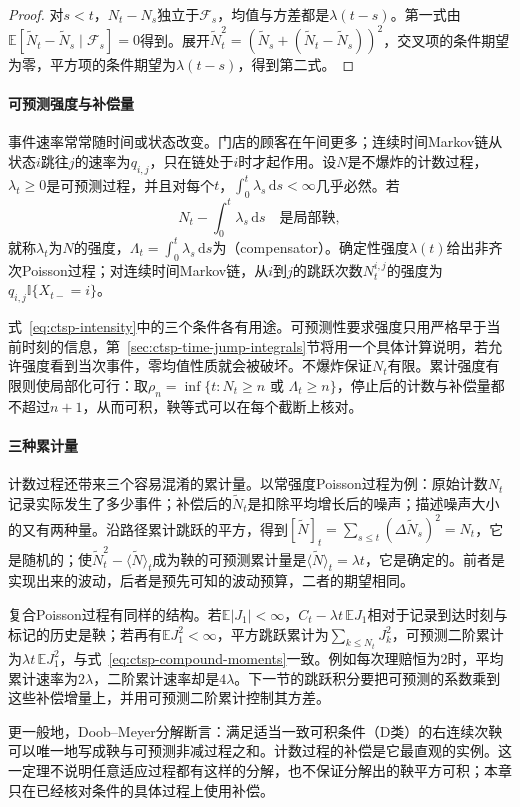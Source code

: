 \begin{proof}
对$s<t$，$N_t-N_s$独立于$\mathcal F_s$，均值与方差都是$\lambda(t-s)$。第一式由$\mathbb E[\widetilde N_t-\widetilde N_s\mid\mathcal F_s]=0$得到。展开$\widetilde N_t^2=(\widetilde N_s+(\widetilde N_t-\widetilde N_s))^2$，交叉项的条件期望为零，平方项的条件期望为$\lambda(t-s)$，得到第二式。
\end{proof}

\paragraph{可预测强度与补偿量}
事件速率常常随时间或状态改变。门店的顾客在午间更多；连续时间Markov链从状态$i$跳往$j$的速率为$q_{i,j}$，只在链处于$i$时才起作用。设$N$是不爆炸的计数过程，$\lambda_t\geq0$是可预测过程，并且对每个$t$，$\int_0^t\lambda_s\,\mathrm ds<\infty$几乎必然。若
\begin{equation}
  N_t-\int_0^t\lambda_s\,\mathrm ds\quad\text{是局部鞅},
  \label{eq:ctsp-intensity}
\end{equation}
就称$\lambda_t$为$N$的强度，$\Lambda_t=\int_0^t\lambda_s\,\mathrm ds$为（compensator）。确定性强度$\lambda(t)$给出非齐次Poisson过程；对连续时间Markov链，从$i$到$j$的跳跃次数$N^{i,j}_t$的强度为$q_{i,j}\mathbb I\{X_{t-}=i\}$。

式~\eqref{eq:ctsp-intensity}中的三个条件各有用途。可预测性要求强度只用严格早于当前时刻的信息，第~\ref{sec:ctsp-time-jump-integrals}节将用一个具体计算说明，若允许强度看到当次事件，零均值性质就会被破坏。不爆炸保证$N_t$有限。累计强度有限则使局部化可行：取$\rho_n=\inf\{t:N_t\geq n\text{ 或 }\Lambda_t\geq n\}$，停止后的计数与补偿量都不超过$n+1$，从而可积，鞅等式可以在每个截断上核对。

\paragraph{三种累计量}
计数过程还带来三个容易混淆的累计量。以常强度Poisson过程为例：原始计数$N_t$记录实际发生了多少事件；补偿后的$\widetilde N_t$是扣除平均增长后的噪声；描述噪声大小的又有两种量。沿路径累计跳跃的平方，得到$[\widetilde N]_t=\sum_{s\leq t}(\Delta\widetilde N_s)^2=N_t$，它是随机的；使$\widetilde N_t^2-\langle\widetilde N\rangle_t$成为鞅的可预测累计量是$\langle\widetilde N\rangle_t=\lambda t$，它是确定的。前者是实现出来的波动，后者是预先可知的波动预算，二者的期望相同。

复合Poisson过程有同样的结构。若$\mathbb E|J_1|<\infty$，$C_t-\lambda t\,\mathbb EJ_1$相对于记录到达时刻与标记的历史是鞅；若再有$\mathbb EJ_1^2<\infty$，平方跳跃累计为$\sum_{k\leq N_t}J_k^2$，可预测二阶累计为$\lambda t\,\mathbb EJ_1^2$，与式~\eqref{eq:ctsp-compound-moments}一致。例如每次理赔恒为$2$时，平均累计速率为$2\lambda$，二阶累计速率却是$4\lambda$。下一节的跳跃积分要把可预测的系数乘到这些补偿增量上，并用可预测二阶累计控制其方差。

更一般地，Doob--Meyer分解断言：满足适当一致可积条件（D类）的右连续次鞅可以唯一地写成鞅与可预测非减过程之和。计数过程的补偿是它最直观的实例。这一定理不说明任意适应过程都有这样的分解，也不保证分解出的鞅平方可积；本章只在已经核对条件的具体过程上使用补偿。
